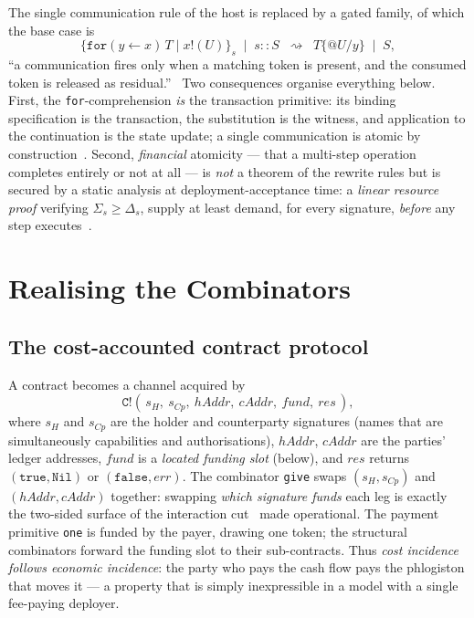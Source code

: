 \documentclass[11pt]{article}
\theoremstyle{definition}
\theoremstyle{plain}
\newcommand{\wrap}[2]{\ensuremath{\{#1\}_{#2}}}
\newcommand{\redto}{\ensuremath{\rightsquigarrow}}
\begin{document}
The single communication rule of the host is replaced by a gated family, of which the base case is
\[
\wrap{\texttt{for}(y\leftarrow x)\,T \mid x!(U)}{s} \;\mid\; s :: S
\;\;\redto\;\;
T\{@U/y\} \;\mid\; S,
\]
``a communication fires only when a matching token is present, and the consumed token is released as
residual.''~\cite[\S4.6]{CAR2026} Two consequences organise everything below. First, the
\texttt{for}-comprehension \emph{is} the transaction primitive: its binding specification is the
transaction, the substitution is the witness, and application to the continuation is the state
update; a single communication is atomic by construction~\cite[\S8.1]{CAR2026}. Second, \emph{financial}
atomicity --- that a multi-step operation completes entirely or not at all --- is \emph{not} a theorem
of the rewrite rules but is secured by a static analysis at deployment-acceptance time: a
\emph{linear resource proof} verifying $\Sigma_s \ge \Delta_s$, supply at least demand, for every
signature, \emph{before} any step executes~\cite[\S8.5]{CAR2026}.

\section{Realising the Combinators}\label{sec:realization}

\subsection{The cost-accounted contract protocol}

A contract becomes a channel acquired by
\[
\texttt{C}!(\,s_H,\ s_{Cp},\ \mathit{hAddr},\ \mathit{cAddr},\ \mathit{fund},\ \mathit{res}\,),
\]
where $s_H$ and $s_{Cp}$ are the holder and counterparty signatures (names that are simultaneously
capabilities and authorisations), $\mathit{hAddr}$, $\mathit{cAddr}$ are the parties' ledger
addresses, $\mathit{fund}$ is a \emph{located funding slot} (below), and $\mathit{res}$ returns
$(\texttt{true},\texttt{Nil})$ or $(\texttt{false},\mathit{err})$. The combinator \texttt{give}
swaps $(s_H,s_{Cp})$ and $(\mathit{hAddr},\mathit{cAddr})$ together: swapping \emph{which signature
funds} each leg is exactly the two-sided surface of the interaction cut~\cite[\S4.8.2]{CAR2026} made
operational. The payment primitive \texttt{one} is funded by the payer, drawing one token; the
structural combinators forward the funding slot to their sub-contracts. Thus \emph{cost incidence
follows economic incidence}: the party who pays the cash flow pays the phlogiston that moves it ---
a property that is simply inexpressible in a model with a single fee-paying deployer.
\end{document}
